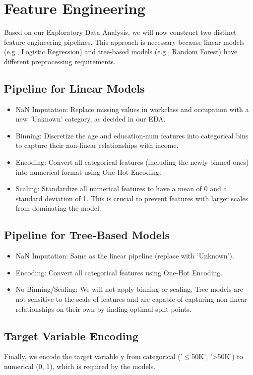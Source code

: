 \thispagestyle{plain}

\chapter{Feature Engineering}
\label{cp:fe}
\vspace{1\baselineskip}

Based on our Exploratory Data Analysis, we will now construct two distinct feature engineering pipelines. This approach is necessary because linear
models (e.g., Logistic Regression) and tree-based models (e.g., Random Forest) have different preprocessing requirements.

\section{Pipeline for Linear Models}
\begin{itemize}
    \item NaN Imputation: Replace missing values in workclass and occupation with a new 'Unknown' category, as decided in our EDA.
    \item Binning: Discretize the age and education-num features into categorical bins to capture their non-linear relationships with income.
    \item Encoding: Convert all categorical features (including the newly binned ones) into numerical format using One-Hot Encoding.
    \item Scaling: Standardize all numerical features to have a mean of 0 and a standard deviation of 1. This is crucial to prevent features with larger scales from dominating the model.
\end{itemize}

\section{Pipeline for Tree-Based Models}
\begin{itemize}
    \item NaN Imputation: Same as the linear pipeline (replace with 'Unknown').
    \item Encoding: Convert all categorical features using One-Hot Encoding.
    \item No Binning/Scaling: We will not apply binning or scaling. Tree models are not sensitive to the scale of features and are capable of capturing non-linear relationships on their own by finding optimal split points.
\end{itemize}

\section{Target Variable Encoding}

Finally, we encode the target variable y from categorical ('$\le$50K', '>50K') to numerical (0, 1), which is required by the models.


